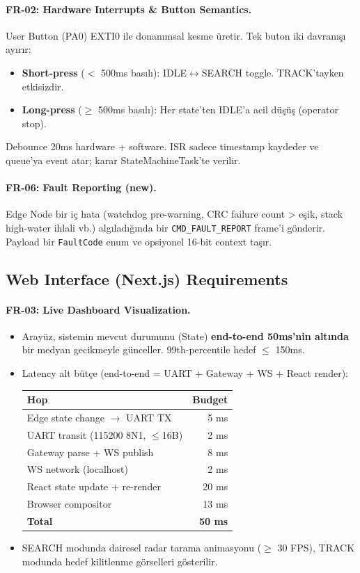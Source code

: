 \paragraph{FR-02: Hardware Interrupts \& Button Semantics.}
User Button (PA0) EXTI0 ile donanımsal kesme üretir. Tek buton iki davranışı ayırır:
\begin{itemize}
    \item \textbf{Short-press} ($<$ 500ms basılı): IDLE$\leftrightarrow$SEARCH toggle. TRACK'tayken etkisizdir.
    \item \textbf{Long-press} ($\geq$ 500ms basılı): Her state'ten IDLE'a acil düşüş (operator stop).
\end{itemize}
Debounce 20ms hardware + software. ISR sadece timestamp kaydeder ve queue'ya event atar; karar StateMachineTask'te verilir.

\paragraph{FR-06: Fault Reporting (new).}
Edge Node bir iç hata (watchdog pre-warning, CRC failure count > eşik, stack high-water ihlali vb.) algıladığında bir \texttt{CMD\_FAULT\_REPORT} frame'i gönderir. Payload bir \texttt{FaultCode} enum ve opsiyonel 16-bit context taşır.

\subsection{Web Interface (Next.js) Requirements}

\paragraph{FR-03: Live Dashboard Visualization.}
\begin{itemize}
    \item Arayüz, sistemin mevcut durumunu (State) \textbf{end-to-end 50ms'nin altında} bir medyan gecikmeyle günceller. 99th-percentile hedef $\leq$ 150ms.
    \item Latency alt bütçe (end-to-end = UART + Gateway + WS + React render):
    \begin{center}
    \begin{tabular}{|l|r|}
    \hline
    \textbf{Hop} & \textbf{Budget} \\
    \hline
    Edge state change $\rightarrow$ UART TX & 5 ms \\
    UART transit (115200 8N1, $\leq$16B) & 2 ms \\
    Gateway parse + WS publish & 8 ms \\
    WS network (localhost) & 2 ms \\
    React state update + re-render & 20 ms \\
    Browser compositor & 13 ms \\
    \hline
    \textbf{Total} & \textbf{50 ms} \\
    \hline
    \end{tabular}
    \end{center}
    \item SEARCH modunda dairesel radar tarama animasyonu ($\geq$ 30 FPS), TRACK modunda hedef kilitlenme görselleri gösterilir.
\end{itemize}

